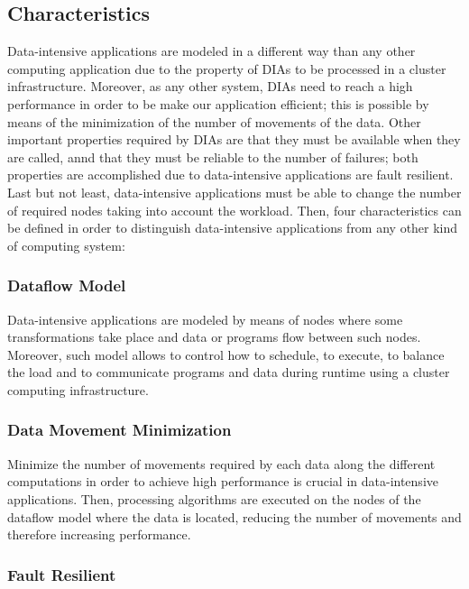 \subsection{Characteristics}

Data-intensive applications are modeled in a different way than any other computing application due to the property of DIAs to be processed in a cluster infrastructure. Moreover, as any other system, DIAs need to reach a high performance in order to be make our application efficient; this is possible by means of the minimization of the number of movements of the data. Other important properties required by DIAs are that they must be available when they are called, annd that they must be reliable to the number of failures; both properties are accomplished due to data-intensive applications are fault resilient. Last but not least, data-intensive applications must be able to change the number of required nodes taking into account the workload. Then, four characteristics can be defined in order to distinguish data-intensive applications from any other kind of computing system:

\subsubsection*{Dataflow Model}

Data-intensive applications are modeled by means of nodes where some transformations take place and data or programs flow between such nodes. Moreover, such model allows to control how to schedule, to execute, to balance the load and to communicate programs and data during runtime using a cluster computing infrastructure.

\subsubsection*{Data Movement Minimization}

Minimize the number of movements required by each data along the different computations in order to achieve high performance is crucial in data-intensive applications. Then, processing algorithms are executed on the nodes of the dataflow model where the data is located, reducing the number of movements and therefore increasing performance.

\subsubsection*{Fault Resilient}

